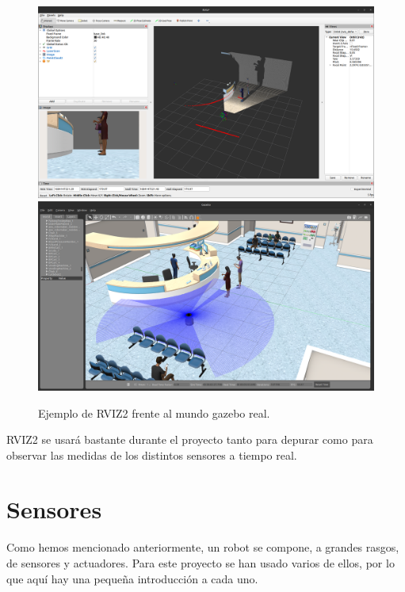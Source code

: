 \begin{figure} [H]
    \begin{center}
        \includegraphics[width=13cm]{figs/c3/RVIZ2.png}
        \includegraphics[width=13cm]{figs/c3/Gazebo_RVIZ.png}
    \end{center}
    \caption[RVIZ2 Vs mundo gazebo]{Ejemplo de RVIZ2 frente al mundo gazebo real.}
    \label{fig:rviz2_example}
\end{figure}

RVIZ2 se usará bastante durante el proyecto tanto para depurar como para observar las medidas de los distintos sensores a tiempo real.

\newpage

\section{Sensores}
\label{sec:sensores}

Como hemos mencionado anteriormente, un robot se compone, a grandes rasgos, de sensores y actuadores. Para este proyecto se han usado varios de ellos, por lo que aquí hay una pequeña introducción a cada uno.

